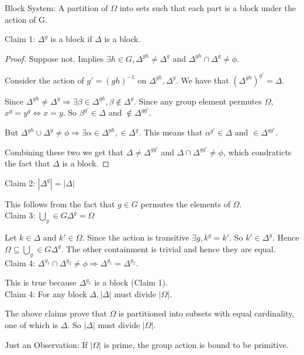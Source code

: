 \begin{definition}{Block System:}
A partition of $\Omega$ into sets such that each part is a block under the action of G.
\end{definition}

Claim 1: $\Delta^g$ is a block if $\Delta$ is a block. 

\begin{proof}
Suppose not. Implies $\exists h \in G, \Delta^{gh} \ne \Delta^g$ and $\Delta^{gh} \cap \Delta^g \ne \phi$.

Consider the action of $g' = (gh)^{-1}$ on $\Delta^{gh}, \Delta^g$. We have that $(\Delta^{gh})^{g'} = \Delta$.

Since $\Delta^{gh} \ne \Delta^g \Rightarrow \exists \beta \in \Delta^{gh}, \beta \notin \Delta^g$. Since any group element permutes $\Omega$, $x^g = y^g \Leftrightarrow x = y$. So $\beta^{g'} \in \Delta$ and $\notin \Delta^{gg'}$.

But $\Delta^{gh} \cup \Delta^g \ne \phi \Rightarrow \exists \alpha \in \Delta^{gh}, \in \Delta^g$. This means that $\alpha^{g'} \in \Delta$ and $\in \Delta^{gg'}$. 

Combining these two we get that $\Delta \ne \Delta^{gg'}$ and $\Delta \cap \Delta^{gg'} \ne \phi$, which condraticts the fact that $\Delta$ is a block.

\end{proof}


Claim 2: $|\Delta^g| = |\Delta|$

This follows from the fact that $g \in G$ permutes the elements of $\Omega$.
\\
Claim 3: $\bigcup_g \in G \Delta^g = \Omega$

Let $k \in \Delta$ and $k' \in \Omega$. Since the action is transitive $\exists g, k^g = k'$. So $k' \in \Delta^g$. Hence $\Omega \subseteq \bigcup_g \in G \Delta^g $. The other containment is trivial and hence they are equal.
\\
Claim 4: $\Delta^{g_1} \cap \Delta^{g_2} \ne \phi \Rightarrow \Delta^{g_1} = \Delta^{g_2}$. 

This is true because $\Delta^{g_1}$ is a block (Claim 1).
\\
Claim 4: For any block $\Delta , |\Delta|$ must divide $|\Omega|$.

The above claims prove that $\Omega$ is partitioned into subsets with equal cardinality, one of which is $\Delta$. So $|\Delta|$ must divide $|\Omega|$. 

Just an Observation: If $|\Omega |$ is prime, the group action is bound to be primitive. 

